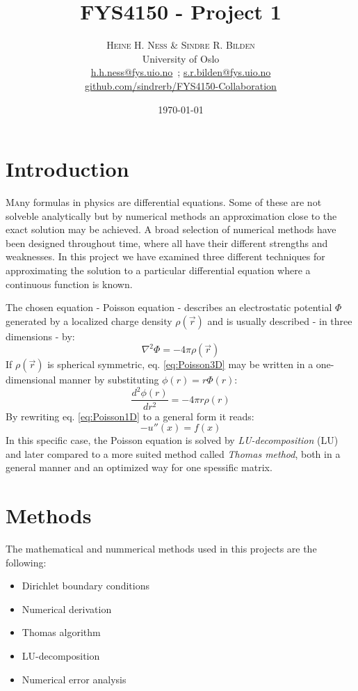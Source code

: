 \documentclass[twoside,twocolumn]{article}
\title{FYS4150 - Project 1} %
\author{%
\textsc{Heine H. Ness \& Sindre R. Bilden} \\[1ex] %
\normalsize University of Oslo \\ %
\normalsize \href{mailto:h.h.ness@fys.uio.no}{h.h.ness@fys.uio.no}\ ; \href{mailto:s.r.bilden@fys.uio.no}{s.r.bilden@fys.uio.no}\\%
\normalsize \href{https://github.com/sindrerb/FYS4150-Collaboration}{github.com/sindrerb/FYS4150-Collaboration}
}
\date{\today} %
\newcommand{\nl}{

\medskip
\noindent
}
\begin{document}
\maketitle


\section{Introduction}

\lettrine[nindent=0em,lines=3]{M}any formulas in physics are differential equations. Some of these are not solveble analytically but by numerical methods an approximation close to the exact solution may be achieved. A broad selection of  numerical methods have been designed throughout time, where all have their different strengths and weaknesses.
In this project we have examined three different techniques for approximating the solution to a particular differential equation where a continuous function is known.\nl 

The chosen equation - Poisson equation - describes an electrostatic potential $\Phi$ generated by a localized charge density $\rho(\vec{r})$ and is usually described - in three dimensions - by:
\begin{equation}
\nabla^2\Phi = -4\pi \rho(\vec{r}) \label{eq:Poisson3D}
\end{equation}
If $\rho(\vec{r})$ is spherical symmetric, eq. \ref{eq:Poisson3D} may be written in a one-dimensional manner by substituting $\phi(r)=r\Phi(r)$:
\begin{equation}
\frac{d^2\phi(r)}{dr^2}=-4\pi r\rho(r) \label{eq:Poisson1D}
\end{equation}
By rewriting eq. \ref{eq:Poisson1D} to a general form it reads:
\begin{equation}
-u''(x)=f(x) \label{eq:general}
\end{equation}
In this specific case, the Poisson equation is solved by \textit{LU-decomposition} (LU) and later compared to a more suited method called \textit{Thomas method}, both in a general manner and an optimized way for one spessific matrix.

\section{Methods}
The mathematical and nummerical methods used in this projects are the following:
\begin{itemize}
\item Dirichlet boundary conditions
\item Numerical derivation
\item Thomas algorithm
\item LU-decomposition
\item Numerical error analysis
\end{itemize}
\end{document}
